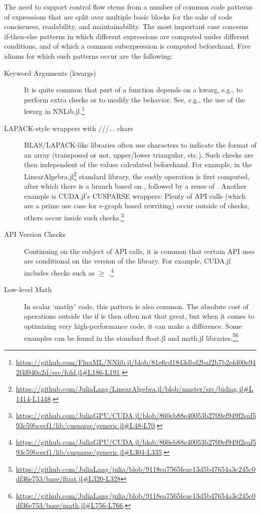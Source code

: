 The need to support control flow stems from a number of common code patterns of expressions that are split over multiple basic blocks for the sake of code conciseness, readability, and maintainability. The most important case concerns if-then-else patterns in which different expressions are computed under different conditions, and of which a common subexpression is computed beforehand. Five idioms for which such patterns occur are the following:
\begin{description}
\item [Keyword Arguments (kwargs)] It is quite common that part of a function depends on a kwarg, e.g., to perform extra checks or to modify the behavior. See, e.g., the use of the  kwarg in NNLib.jl.\footnote{\url{https://github.com/FluxML/NNlib.jl/blob/81e6cd1843dbd2baf2b7b2efd00e942f4f040a2d/src/fold.jl\#L186-L191}.}
\item [LAPACK-style wrappers with ///... chars] BLAS/LAPACK-like libraries often use characters to indicate the format of an array (transposed or not, upper/lower triangular, etc.). Such checks are then independent of the values calculated beforehand. For example, in the LinearAlgebra.jl\footnote{\url{https://github.com/JuliaLang/LinearAlgebra.jl/blob/master/src/bidiag.jl\#L1414-L1448}.} standard library, the costly operation  is first computed, after which there is a branch based on , followed by a reuse of . Another example is CUDA.jl's CUSPARSE wrappers: Plenty of API calls (which are a prime use case for e-graph based rewriting) occur outside of  checks, others occur inside such checks.\footnote{\url{https://github.com/JuliaGPU/CUDA.jl/blob/860eb88e40053b2709ef949f2eaf593c59bcecf1/lib/cusparse/generic.jl\#L48-L70}.}
\item [API Version Checks] Continuing on the subject of API calls, it is common that certain API uses are conditional on the version of the library. For example, CUDA.jl includes checks such as  $\geq$ .\footnote{\url{https://github.com/JuliaGPU/CUDA.jl/blob/860eb88e40053b2709ef949f2eaf593c59bcecf1/lib/cusparse/generic.jl\#L304-L335}.}
\item [Low-level Math] In scalar ‘mathy’ code, this pattern is also common. The absolute cost of operations outside the if is then often not that great, but when it comes to optimizing very high-performance code, it can make a difference. Some examples can be found in the standard float.jl and math.jl libraries.\footnote{\url{https://github.com/JuliaLang/julia/blob/9118ea7565feae13d5b47654a3c245c0df36e753/base/float.jl\#L320-L328}}\footnote{\url{https://github.com/JuliaLang/julia/blob/9118ea7565feae13d5b47654a3c245c0df36e753/base/math.jl\#L756-L766}.}

\end{description}
